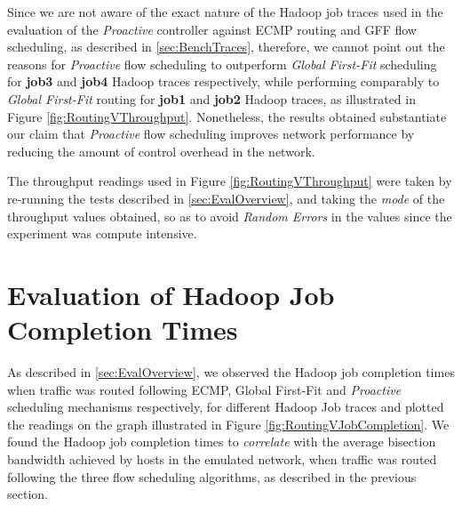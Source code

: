 Since we are not aware of the exact nature of the Hadoop job traces used in the evaluation of the \textit{Proactive} controller against ECMP routing and GFF flow scheduling, as described in \ref{sec:BenchTraces}, therefore, we cannot point out the reasons for \textit{Proactive} flow scheduling to outperform \textit{Global First-Fit} scheduling for \textbf{job3} and \textbf{job4} Hadoop traces respectively, while performing comparably to \textit{Global First-Fit} routing for \textbf{job1} and \textbf{job2} Hadoop traces, as illustrated in Figure \ref{fig:RoutingVThroughput}. Nonetheless, the results obtained substantiate our claim that \textit{Proactive} flow scheduling improves network performance by reducing the amount of control overhead in the network.      

The throughput readings used in Figure \ref{fig:RoutingVThroughput} were taken by re-running the tests described in \ref{sec:EvalOverview}, and taking the \textit{mode} of the throughput values obtained, so as to avoid \textit{Random Errors} in the values since the experiment was compute intensive. 

\section{Evaluation of Hadoop Job Completion Times} \label{sec:EvalJobCompletion}

As described in \ref{sec:EvalOverview}, we observed the Hadoop job completion times when traffic was routed following ECMP, Global First-Fit and \textit{Proactive} scheduling mechanisms respectively, for different Hadoop Job traces and plotted the readings on the graph illustrated in Figure \ref{fig:RoutingVJobCompletion}. We found the Hadoop job completion times to \textit{correlate} with the average bisection bandwidth achieved by hosts in the emulated network, when traffic was routed following the three flow scheduling algorithms, as described in the previous section.

